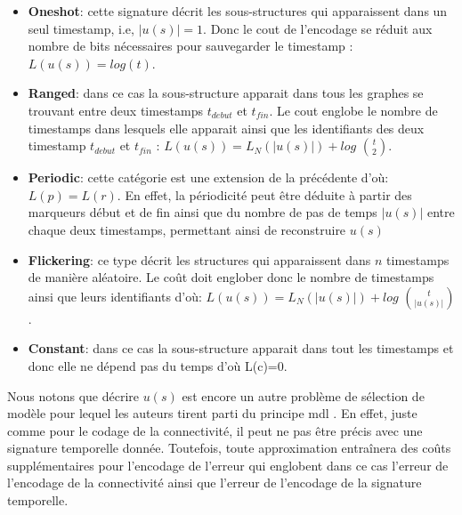 			 
			 \begin{itemize}[label=$\circ$]
			 \item \textbf{Oneshot}: cette signature décrit les sous-structures qui apparaissent dans un seul timestamp, i.e, $|u(s)|=1$. Donc le cout de l'encodage se réduit aux nombre de bits nécessaires pour sauvegarder le timestamp : $L(u(s)) = log(t)$.
			 \item \textbf{Ranged}: dans ce cas la sous-structure apparait dans tous les graphes se trouvant entre deux timestamps $t_{debut}$ et $t_{fin}$. Le cout englobe le nombre de timestamps dans lesquels elle apparait ainsi que les identifiants des deux timestamp $t_{debut}$ et $t_{fin}$ : $L(u(s)) = L_{N}(|u(s)|) +log$ ${t}\choose{2}$.
			 \item \textbf{Periodic}: cette catégorie est une extension de la précédente d'où: $L(p) = L(r)$.
			 En effet, la périodicité peut être déduite à partir des marqueurs début et de fin ainsi que du nombre de pas de temps $|u(s)|$ entre chaque deux timestamps, permettant ainsi de reconstruire $u(s)$
			 \item \textbf{Flickering}: ce type décrit les structures qui apparaissent dans $n$ timestamps de manière aléatoire. Le coût doit englober donc le nombre de timestamps ainsi que leurs identifiants d'où: 
			 $L(u(s)) = L_{N}(|u(s)|) +log$ ${t}\choose{|u(s)|}$.
			 \item \textbf{Constant}: dans ce cas la sous-structure apparait dans tout les timestamps et donc elle ne dépend pas du temps d'où L(c)=0.
			 \end{itemize} \label{par:TimeCrunch}
			 
			 
			 Nous notons que décrire $u(s)$ est encore un autre problème de sélection de modèle pour lequel les auteurs tirent parti du principe \gls{mdl} . En effet, juste comme pour le codage de la connectivité, il peut ne pas être précis avec une signature temporelle donnée. Toutefois, toute approximation entraînera des coûts supplémentaires pour l'encodage de l'erreur qui englobent dans ce cas l'erreur de l'encodage de la connectivité ainsi que l'erreur de l'encodage de la signature temporelle.
			 
